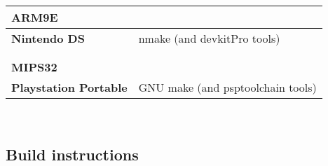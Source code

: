 \begin{tabular}{l l}
{\bf{\large ARM9E}} &                                          \\
\hline\hline
{\bf Nintendo DS} & nmake (and devkitPro\cite{devkitPro} tools)\\
\hline
                   &                                           \\
                   &                                           \\

{\bf{\large MIPS32}} &                                         \\
\hline\hline
{\bf Playstation Portable} & GNU make (and psptoolchain\cite{psptoolchain} tools) \\
\hline

\end{tabular}\\

\pagebreak

\subsection{Build instructions}


